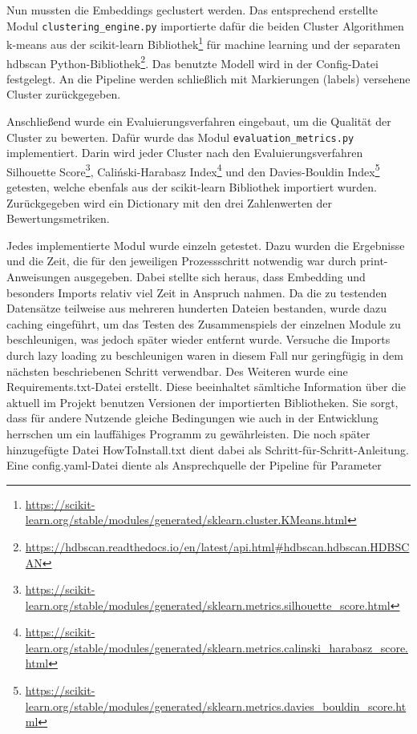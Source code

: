 Nun mussten die Embeddings geclustert werden. Das entsprechend erstellte Modul \texttt{clustering\_engine.py} importierte dafür die beiden Cluster Algorithmen k-means aus der scikit-learn Bibliothek\footnote{\url{https://scikit-learn.org/stable/modules/generated/sklearn.cluster.KMeans.html}} für machine learning und der separaten hdbscan Python-Bibliothek\footnote{\url{https://hdbscan.readthedocs.io/en/latest/api.html\#hdbscan.hdbscan.HDBSCAN}}. Das benutzte Modell wird in der Config-Datei festgelegt. An die Pipeline werden schließlich mit Markierungen (labels) versehene Cluster zurückgegeben.

Anschließend wurde ein Evaluierungsverfahren eingebaut, um die Qualität der Cluster zu bewerten. Dafür wurde das Modul \texttt{evaluation\_metrics.py} implementiert. Darin wird jeder Cluster nach den Evaluierungsverfahren Silhouette Score\footnote{\url{https://scikit-learn.org/stable/modules/generated/sklearn.metrics.silhouette_score.html}}, Caliński-Harabasz Index\footnote{\url{https://scikit-learn.org/stable/modules/generated/sklearn.metrics.calinski_harabasz_score.html}} und den Davies-Bouldin Index\footnote{\url{https://scikit-learn.org/stable/modules/generated/sklearn.metrics.davies_bouldin_score.html}} getesten, welche ebenfals aus der scikit-learn Bibliothek importiert wurden. Zurückgegeben wird ein Dictionary mit den drei Zahlenwerten der Bewertungsmetriken.

Jedes implementierte Modul wurde einzeln getestet. Dazu wurden die Ergebnisse und die Zeit, die für den jeweiligen Prozessschritt notwendig war durch print-Anweisungen ausgegeben. Dabei stellte sich heraus, dass Embedding und besonders Imports relativ viel Zeit in Anspruch nahmen. Da die zu testenden Datensätze teilweise aus mehreren hunderten Dateien bestanden, wurde dazu caching eingeführt, um das Testen des Zusammenspiels der einzelnen Module zu beschleunigen, was jedoch später wieder entfernt wurde. Versuche die Imports durch lazy loading zu beschleunigen waren in diesem Fall nur geringfügig in dem nächsten beschriebenen Schritt verwendbar. Des Weiteren wurde eine Requirements.txt-Datei erstellt. Diese beeinhaltet sämltiche Information über die aktuell im Projekt benutzen Versionen der importierten Bibliotheken. Sie sorgt, dass für andere Nutzende gleiche Bedingungen wie auch in der Entwicklung herrschen um ein lauffähiges Programm zu gewährleisten. Die noch später hinzugefügte Datei HowToInstall.txt dient dabei als Schritt-für-Schritt-Anleitung. Eine config.yaml-Datei diente als Ansprechquelle der Pipeline für Parameter 

